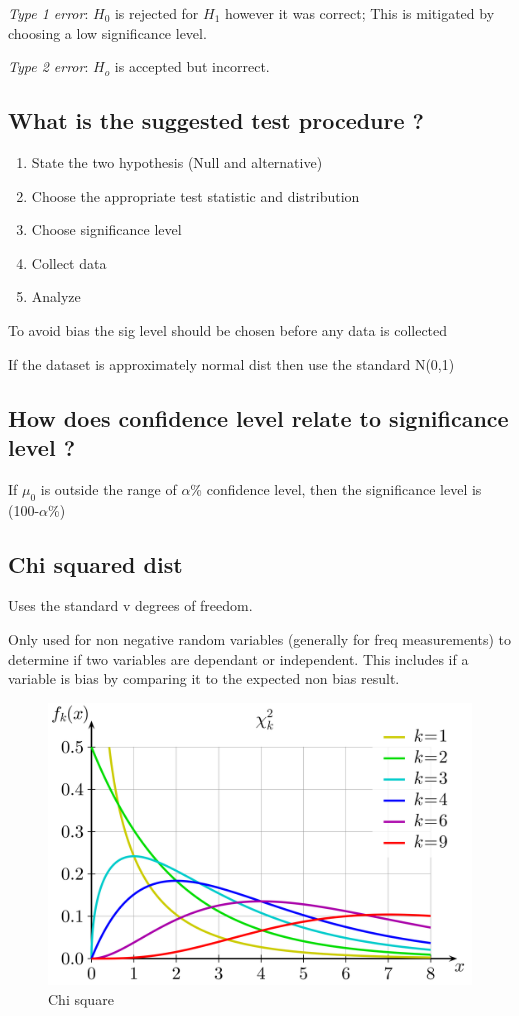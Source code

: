 \documentclass[11pt]{scrartcl} %
\begin{document}
\emph{Type 1 error}: \(H_0\) is rejected for \(H_1\) however it was
correct; This is mitigated by choosing a low significance level.

\emph{Type 2 error}: \(H_o\) is accepted but incorrect.

\subsection{What is the suggested test procedure
?}

\begin{enumerate}
\item State the two hypothesis (Null and alternative)
\item Choose the appropriate test statistic and distribution
\item Choose significance level
\item Collect data
\item Analyze
\end{enumerate}

To avoid bias the sig level should be chosen before any data is
collected

If the dataset is approximately normal dist then use the standard N(0,1)

\subsection{How does confidence level relate to significance level
?}

If \(\mu_0\) is outside the range of \(\alpha\)\% confidence level, then
the significance level is (100-\(\alpha\)\%)

\subsection{Chi squared dist}

Uses the standard v degrees of freedom.

Only used for non negative random variables (generally for freq
measurements) to determine if two variables are dependant or
independent. This includes if a variable is bias by comparing it to the
expected non bias result.

\begin{figure}[h] %
	\centering
	\includegraphics[width=0.5\columnwidth]{Chi-square_pdf.png} %
	\caption{Chi square}
\end{figure}
\end{document}
